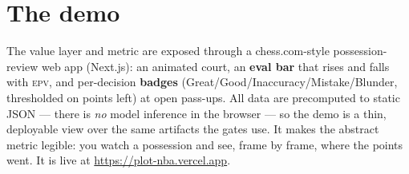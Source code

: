 \documentclass[11pt]{article}
\newcommand{\epv}{\textsc{epv}}
\begin{document}
\section{The demo}\label{sec:demo}
The value layer and metric are exposed through a chess.com-style possession-review web app (Next.js): an
animated court, an \textbf{eval bar} that rises and falls with \epv{}, and per-decision \textbf{badges}
(Great/Good/Inaccuracy/Mistake/Blunder, thresholded on points left) at open pass-ups. All data are
precomputed to static JSON --- there is \emph{no} model inference in the browser --- so the demo is a thin,
deployable view over the same artifacts the gates use. It makes the abstract metric legible: you watch a
possession and see, frame by frame, where the points went. It is live at
\url{https://plot-nba.vercel.app}.

\end{document}
